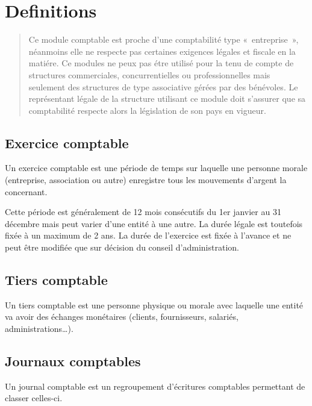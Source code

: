 \documentclass[a4paper,10pt,oneside,french]{sphinxmanual}
\begin{document}
\section{Definitions}
\label{\detokenize{accounting/definition:definitions}}\label{\detokenize{accounting/definition::doc}}\begin{quote}

 Ce module comptable est proche d’une comptabilité type « entreprise », néanmoins elle ne respecte pas certaines exigences légales et fiscale en la matiére.
Ce modules ne peux pas étre utilisé pour la tenu de compte de structures commerciales, concurrentielles ou professionnelles mais seulement des structures de type associative gérées par des bénévoles.
Le représentant légale de la structure utilisant ce module doit s’assurer que sa comptabilité respecte alors la législation de son pays en vigueur.
\end{quote}


\subsection{Exercice comptable}
\label{\detokenize{accounting/definition:exercice-comptable}}
Un exercice comptable est une période de temps sur laquelle une
personne morale (entreprise, association ou autre) enregistre tous les
mouvements d’argent la concernant.

Cette période est généralement de 12 mois consécutifs du 1er janvier au 31 décembre mais peut varier
d’une entité à une autre. La durée légale est toutefois fixée à un
maximum de 2 ans. La durée de l’exercice est fixée à l’avance et ne
peut être modifiée que sur décision du conseil d’administration.


\subsection{Tiers comptable}
\label{\detokenize{accounting/definition:tiers-comptable}}
Un tiers comptable est une personne physique ou morale avec
laquelle une entité va avoir des échanges monétaires (clients,
fournisseurs, salariés, administrations…).


\subsection{Journaux comptables}
\label{\detokenize{accounting/definition:journaux-comptables}}
Un journal comptable est un regroupement d’écritures comptables permettant de classer celles-ci.
\end{document}
